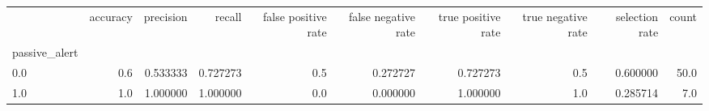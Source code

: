 \begin{tabular}{lrrrrrrrrr}
\toprule
{} &  accuracy &  precision &    recall &  false positive rate &  false negative rate &  true positive rate &  true negative rate &  selection rate &  count \\
passive\_alert &           &            &           &                      &                      &                     &                     &                 &        \\
\midrule
0.0           &       0.6 &   0.533333 &  0.727273 &                  0.5 &             0.272727 &            0.727273 &                 0.5 &        0.600000 &   50.0 \\
1.0           &       1.0 &   1.000000 &  1.000000 &                  0.0 &             0.000000 &            1.000000 &                 1.0 &        0.285714 &    7.0 \\
\bottomrule
\end{tabular}

